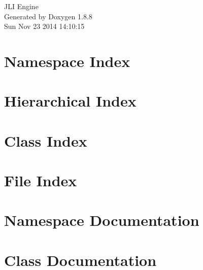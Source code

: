 \documentclass[twoside]{book}
\newcommand{\+}{\discretionary{\mbox{\scriptsize$\hookleftarrow$}}{}{}}
\newcommand{\clearemptydoublepage}{%
  \newpage{\pagestyle{empty}\cleardoublepage}%
}
\begin{document}
\hypersetup{pageanchor=false,
             bookmarks=true,
             bookmarksnumbered=true,
             pdfencoding=unicode
            }
\begin{titlepage}
\vspace*{7cm}
\begin{center}%
{\Large J\+L\+I Engine }\\
\vspace*{1cm}
{\large Generated by Doxygen 1.8.8}\\
\vspace*{0.5cm}
{\small Sun Nov 23 2014 14:10:15}\\
\end{center}
\end{titlepage}
\clearemptydoublepage
\tableofcontents
\clearemptydoublepage
{}
\hypersetup{pageanchor=true}

\chapter{Namespace Index}

\chapter{Hierarchical Index}

\chapter{Class Index}

\chapter{File Index}

\chapter{Namespace Documentation}


\chapter{Class Documentation}










\end{document}
